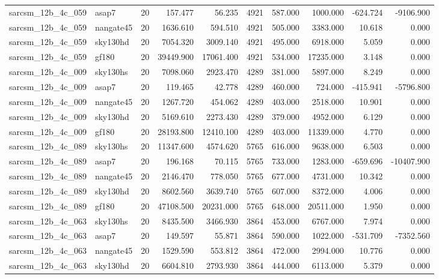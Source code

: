 \begin{longtable}{llrrrrrrrr}
sarcsm\_12b\_4c\_059 & asap7 & 20 & 157.477 & 56.235 & 4921 & 587.000 & 1000.000 & -624.724 & -9106.900 \\
sarcsm\_12b\_4c\_059 & nangate45 & 20 & 1636.610 & 594.510 & 4921 & 505.000 & 3383.000 & 10.618 & 0.000 \\
sarcsm\_12b\_4c\_059 & sky130hd & 20 & 7054.320 & 3009.140 & 4921 & 495.000 & 6918.000 & 5.059 & 0.000 \\
sarcsm\_12b\_4c\_059 & gf180 & 20 & 39449.900 & 17061.400 & 4921 & 534.000 & 17235.000 & 3.148 & 0.000 \\
sarcsm\_12b\_4c\_009 & sky130hs & 20 & 7098.060 & 2923.470 & 4289 & 381.000 & 5897.000 & 8.249 & 0.000 \\
sarcsm\_12b\_4c\_009 & asap7 & 20 & 119.465 & 42.778 & 4289 & 460.000 & 724.000 & -415.941 & -5796.800 \\
sarcsm\_12b\_4c\_009 & nangate45 & 20 & 1267.720 & 454.062 & 4289 & 403.000 & 2518.000 & 10.901 & 0.000 \\
sarcsm\_12b\_4c\_009 & sky130hd & 20 & 5169.610 & 2273.430 & 4289 & 379.000 & 4952.000 & 6.129 & 0.000 \\
sarcsm\_12b\_4c\_009 & gf180 & 20 & 28193.800 & 12410.100 & 4289 & 403.000 & 11339.000 & 4.770 & 0.000 \\
sarcsm\_12b\_4c\_089 & sky130hs & 20 & 11347.600 & 4574.620 & 5765 & 616.000 & 9638.000 & 6.503 & 0.000 \\
sarcsm\_12b\_4c\_089 & asap7 & 20 & 196.168 & 70.115 & 5765 & 733.000 & 1283.000 & -659.696 & -10407.900 \\
sarcsm\_12b\_4c\_089 & nangate45 & 20 & 2146.470 & 778.050 & 5765 & 677.000 & 4731.000 & 10.342 & 0.000 \\
sarcsm\_12b\_4c\_089 & sky130hd & 20 & 8602.560 & 3639.740 & 5765 & 607.000 & 8372.000 & 4.006 & 0.000 \\
sarcsm\_12b\_4c\_089 & gf180 & 20 & 47108.500 & 20231.000 & 5765 & 648.000 & 20511.000 & 1.950 & 0.000 \\
sarcsm\_12b\_4c\_063 & sky130hs & 20 & 8435.500 & 3466.930 & 3864 & 453.000 & 6767.000 & 7.974 & 0.000 \\
sarcsm\_12b\_4c\_063 & asap7 & 20 & 149.597 & 55.871 & 3864 & 590.000 & 1022.000 & -531.709 & -7352.560 \\
sarcsm\_12b\_4c\_063 & nangate45 & 20 & 1529.590 & 553.812 & 3864 & 472.000 & 2994.000 & 10.776 & 0.000 \\
sarcsm\_12b\_4c\_063 & sky130hd & 20 & 6604.810 & 2793.930 & 3864 & 444.000 & 6113.000 & 5.379 & 0.000 \\

\end{longtable}
